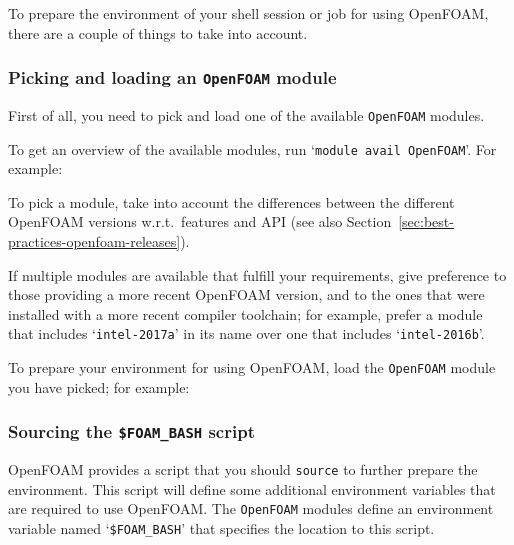 To prepare the environment of your shell session or job for using OpenFOAM,
there are a couple of things to take into account.


\subsubsection{Picking and loading an {\small\texttt{OpenFOAM}} module}

First of all, you need to pick and load one of the available {\small\texttt{OpenFOAM}} modules.

To get an overview of the available modules, run `{\small\texttt{module avail OpenFOAM}}'. For example:

\begin{prompt}
\end{prompt}

To pick a module, take into account the differences between the different OpenFOAM versions w.r.t.\ features and
API (see also Section~\ref{sec:best-practices-openfoam-releases}).

If multiple modules are available that fulfill your requirements, give preference to those providing a more recent
OpenFOAM version, and to the ones that were installed with a more recent compiler toolchain; for example, prefer
a module that includes `{\small\texttt{intel-2017a}}' in its name over one that includes
`{\small\texttt{intel-2016b}}'.

To prepare your environment for using OpenFOAM, load the {\small\texttt{OpenFOAM}} module you have picked; for example:

\begin{prompt}
\end{prompt}

\subsubsection{Sourcing the {\small\texttt{\$FOAM\_BASH}} script}

OpenFOAM provides a script that you should \texttt{\small{source}} to further prepare the environment.
This script will define some additional environment variables that are required to use OpenFOAM.
The {\small\texttt{OpenFOAM}} modules define an environment variable named `\texttt{\small\$FOAM\_BASH}'
that specifies the location to this script.

